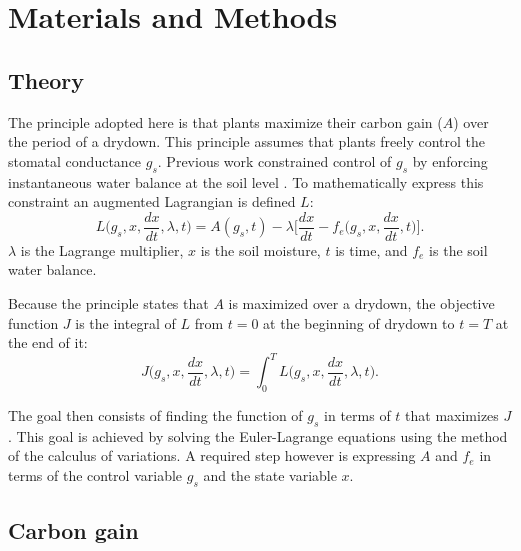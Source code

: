 \documentclass[utf8]{frontiersSCNS} %
\begin{document}
\section{Materials and Methods}

\subsection{Theory}

The principle adopted here is that plants maximize their carbon gain ($A$) over the period of a drydown. This principle assumes that plants freely control the stomatal conductance $g_s$. Previous work constrained control of $g_s$ by enforcing instantaneous water balance at the soil level \citep{Manzoni2013}. To mathematically express this constraint an augmented Lagrangian is defined $L$:
\begin{equation}
    \label{eqn:Lagrangian}
    L\Big(g_s, x, \frac{dx}{dt}, \lambda, t\Big) = A(g_s, t) - \lambda \Bigg[ \frac{dx}{dt} - f_e\Big(g_s, x, \frac{dx}{dt}, t\Big)\Bigg].
\end{equation}
$\lambda$ is the Lagrange multiplier, $x$ is the soil moisture, $t$ is time, and $f_e$ is the soil water balance.

Because the principle states that $A$ is maximized over a drydown, the objective function $J$ is the integral of $L$ from $t=0$ at the beginning of drydown to $t=T$ at the end of it:
\begin{equation}
    \label{eqn:Objective}
    J\Big(g_s, x, \frac{dx}{dt}, \lambda, t\Big) = \int_0^T L\Big(g_s, x, \frac{dx}{dt}, \lambda, t\Big).
\end{equation}

The goal then consists of finding the function of $g_s$ in terms of $t$ that maximizes $J$. This goal is achieved by solving the Euler-Lagrange equations using the method of the calculus of variations. A required step however is expressing $A$ and $f_e$ in terms of the control variable $g_s$ and the state variable $x$.

\subsection{Carbon gain}
\end{document}
